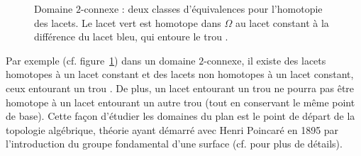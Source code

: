 \begin{figure}[H]
\begin{center}
\shorthandoff{!}\shorthandoff{:}
\shorthandon{!}\shorthandoff{:}
\caption{ \small Domaine $2$-connexe : deux classes d'équivalences pour l'homotopie des lacets. Le lacet vert est homotope dans $\Omega$ au lacet constant à la différence du lacet bleu, qui entoure le \og trou \fg{}.}\label{fig:homotopie}
\end{center}
\end{figure}

Par exemple (cf. figure~\ref{fig:homotopie}) dans un domaine $2$-connexe, il existe des lacets homotopes à un lacet constant et des lacets non homotopes à un lacet constant, ceux entourant un \og trou \fg{}. De plus, un lacet entourant un \og trou \fg{} ne pourra pas être homotope à un lacet entourant un autre \og trou \fg{} (tout en conservant le même point de base). Cette façon d'étudier les domaines du plan est le point de départ de la topologie algébrique, théorie ayant démarré avec Henri Poincaré en 1895 par l'introduction du groupe fondamental d'une surface (cf. \cite{fulton1997algebraic} pour plus de détails).


